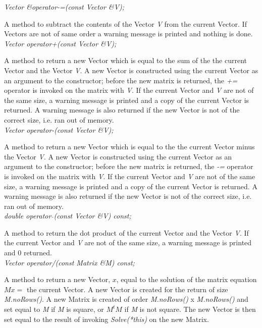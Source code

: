 {\em Vector \&operator-=(const Vector \&V);} 

A method to subtract the contents of the Vector {\em V} from the
current Vector. If Vectors are not of same order a warning message is
printed and nothing is done.  \\ 


{\em  Vector operator+(const Vector \&V);} 

A method to return a new Vector which is equal to the sum of the
the current Vector and the Vector {\em V}. A new Vector is constructed
using the current Vector as an argument to the constructor; before the
new matrix is returned, the {\em +=} operator is invoked on the matrix
with {\em V}. If the current Vector and {\em V} are not of the same size,
a warning message is printed and a copy of the current Vector is
returned. A warning message is also returned if the new Vector is not
of the correct size, i.e. ran out of memory. \\ 


{\em  Vector operator-(const Vector \&V);} 

A method to return a new Vector which is equal to the the current
Vector minus the Vector {\em V}. A new Vector is constructed using the
current Vector as an argument to the constructor; before the new
matrix is returned, the {\em -=} operator is invoked on the matrix
with {\em V}. If the current Vector and {\em V} are not of the same size,
a warning message is printed and a copy of the current Vector is
returned. A warning message is also returned if the new Vector is not
of the correct size, i.e. ran out of memory. \\ 


{\em double operator{ }$ \hat{ }$(const Vector \&V) const;   } 

A method to return the dot product of the current Vector and the
Vector {\em V}. If the current Vector and {\em V} are not of the same
size, a warning message is printed and $0$ returned. \\ 

{\em Vector operator/(const Matrix \&M) const; } 

A method to return a new Vector, $x$, equal to the solution of the
matrix equation $Mx=$ the current Vector. A new Vector is created for
the return of size {\em M.noRows()}. A new Matrix is created of order
{\em M.noRows()} x {\em M.noRows()} and set equal to {\em M} if {\em
M} is square, or $M^tM$ if {\em M} is not square. The new Vector is
then set equal to the result of invoking {\em Solve(*this)} on the new
Matrix. \\ 

